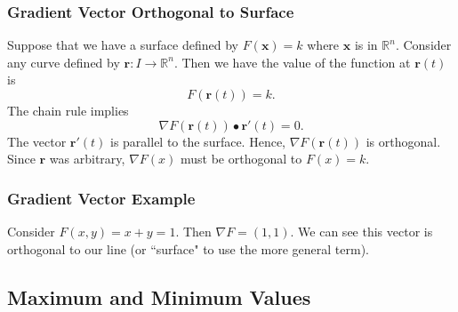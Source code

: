 \documentclass{beamer}
\begin{document}
\begin{frame}
\frametitle{Gradient Vector Orthogonal to Surface}
\small 
Suppose that we have a surface defined by $F({\boldsymbol x}) = k$ where ${\boldsymbol x}$ is in $\mathbb{R}^n$. Consider any curve defined by ${\boldsymbol r}: I\to \mathbb{R}^n$. Then we have the value of the function at ${\boldsymbol r}(t)$ is
$$
F({\boldsymbol r}(t)) = k.
$$
The chain rule implies
$$
\nabla F({\boldsymbol r}(t))\bullet {\boldsymbol r'}(t) = 0.
$$
The vector ${\boldsymbol r'}(t)$ is parallel to the surface. Hence, $\nabla F({\boldsymbol r}(t))$ is orthogonal. Since ${\boldsymbol r}$ was arbitrary, $\nabla F(x)$ must be orthogonal to $F(x) = k$.
\end{frame}

\begin{frame}
\frametitle{Gradient Vector Example}

Consider $F(x, y) = x + y = 1$. Then $ \nabla F = (1, 1)$. We can see this vector is orthogonal to our line (or ``surface" to use the more general term).
\begin{center}
\end{center}
\end{frame}


\subsection{Maximum and Minimum Values}
\end{document}
